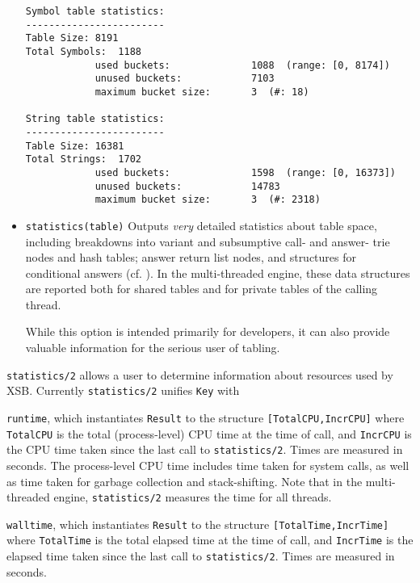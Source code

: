 \begin{description}
\begin{itemize}
{\begin{verbatim}
Symbol table statistics:
------------------------
Table Size:	8191
Total Symbols:	1188
            used buckets:              1088  (range: [0, 8174])
            unused buckets:            7103
            maximum bucket size:       3  (#: 18)

String table statistics:
------------------------
Table Size:	16381
Total Strings:	1702
            used buckets:              1598  (range: [0, 16373])
            unused buckets:            14783
            maximum bucket size:       3  (#: 2318)
\end{verbatim}}
%
\item {\tt statistics(table)} Outputs {\em very} detailed statistics
  about table space, including breakdowns into variant and subsumptive
  call- and answer- trie nodes and hash tables; answer return list
  nodes, and structures for conditional answers (cf. \cite{SaSw98,
    RRSSW98, TST99, CuSW99a}).  In the multi-threaded engine, these
  data structures are reported both for shared tables and for private
  tables of the calling thread.

  While this option is intended primarily for developers, it can also
  provide valuable information for the serious user of tabling.
\end{itemize}

%
{\tt statistics/2} allows a user to determine information about
resources used by XSB.  Currently {\tt statistics/2} unifies {\tt Key}
with
\bi
\item {\tt runtime}, which instantiates {\tt Result} to the structure
  {\tt [TotalCPU,IncrCPU]} where {\tt TotalCPU} is the total
  (process-level) CPU time at the time of call, and {\tt IncrCPU} is
  the CPU time taken since the last call to {\tt statistics/2}.  Times
  are measured in seconds.  The process-level CPU time includes time
  taken for system calls, as well as time taken for garbage collection
  and stack-shifting.  Note that in the multi-threaded engine,
  {\tt statistics/2} measures the time for all threads.
%
\item {\tt walltime}, which instantiates {\tt Result} to the structure
  {\tt [TotalTime,IncrTime]} where {\tt TotalTime} is the total
  elapsed time at the time of call, and {\tt IncrTime} is the elapsed
  time taken since the last call to {\tt statistics/2}.  Times are
  measured in seconds.  
\ei

\end{description}
